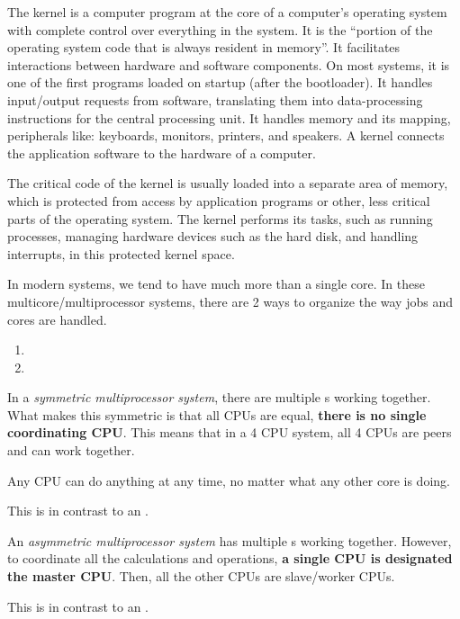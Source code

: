 \begin{definition}[Kernel]\label{def:Kernel}
  The kernel is a computer program at the core of a computer's operating system with complete control over everything in the system.
  It is the ``portion of the operating system code that is always resident in memory''.
  It facilitates interactions between hardware and software components.
  On most systems, it is one of the first programs loaded on startup (after the bootloader).
  It handles input/output requests from software, translating them into data-processing instructions for the central processing unit.
  It handles memory and its mapping, peripherals like: keyboards, monitors, printers, and speakers.
  A kernel connects the application software to the hardware of a computer.

  The critical code of the kernel is usually loaded into a separate area of memory, which is protected from access by application programs or other, less critical parts of the operating system.
  The kernel performs its tasks, such as running processes, managing hardware devices such as the hard disk, and handling interrupts, in this protected kernel space.
\end{definition}

In modern systems, we tend to have much more than a single  core.
In these multicore/multiprocessor systems, there are 2 ways to organize the way jobs and cores are handled.
\begin{enumerate}[noitemsep]
\item {}
\item {}
\end{enumerate}

\begin{definition}\label{def:Symmetric_Multiprocessor_System}
  In a \emph{symmetric multiprocessor system}, there are multiple s working together.
  What makes this symmetric is that all CPUs are equal, \textbf{there is no single coordinating CPU}.
  This means that in a 4 CPU system, all 4 CPUs are peers and can work together.

  Any CPU can do anything at any time, no matter what any other core is doing.

  This is in contrast to an .
\end{definition}

\begin{definition}\label{def:Asymmetric_Multiprocessor_System}
  An \emph{asymmetric multiprocessor system} has multiple s working together.
  However, to coordinate all the calculations and operations, \textbf{a single CPU is designated the master CPU}.
  Then, all the other CPUs are slave/worker CPUs.

  This is in contrast to an .
\end{definition}

